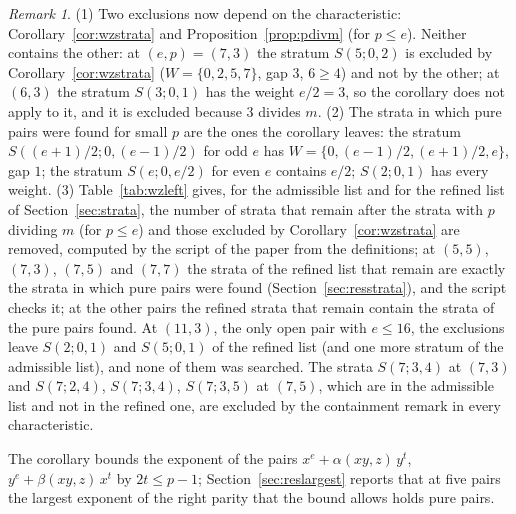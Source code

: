 \documentclass[11pt]{article}
\theoremstyle{definition}
\theoremstyle{remark}
\newtheorem{remark}{Remark}
\begin{document}
\begin{remark}\label{rem:wzstrata}
(1) Two exclusions now depend on the characteristic: Corollary~\ref{cor:wzstrata} and Proposition~\ref{prop:pdivm} (for $p\le e$). Neither contains the other: at $(e,p)=(7,3)$ the stratum $S(5;0,2)$ is excluded by Corollary~\ref{cor:wzstrata} ($W=\{0,2,5,7\}$, gap $3$, $6\ge4$) and not by the other; at $(6,3)$ the stratum $S(3;0,1)$ has the weight $e/2=3$, so the corollary does not apply to it, and it is excluded because $3$ divides $m$. (2) The strata in which pure pairs were found for small $p$ are the ones the corollary leaves: the stratum $S((e+1)/2;0,(e-1)/2)$ for odd $e$ has $W=\{0,(e-1)/2,(e+1)/2,e\}$, gap $1$; the stratum $S(e;0,e/2)$ for even $e$ contains $e/2$; $S(2;0,1)$ has every weight. (3) Table~\ref{tab:wzleft} gives, for the admissible list and for the refined list of Section~\ref{sec:strata}, the number of strata that remain after the strata with $p$ dividing $m$ (for $p\le e$) and those excluded by Corollary~\ref{cor:wzstrata} are removed, computed by the script of the paper from the definitions; at $(5,5)$, $(7,3)$, $(7,5)$ and $(7,7)$ the strata of the refined list that remain are exactly the strata in which pure pairs were found (Section~\ref{sec:resstrata}), and the script checks it; at the other pairs the refined strata that remain contain the strata of the pure pairs found. At $(11,3)$, the only open pair with $e\le16$, the exclusions leave $S(2;0,1)$ and $S(5;0,1)$ of the refined list (and one more stratum of the admissible list), and none of them was searched. The strata $S(7;3,4)$ at $(7,3)$ and $S(7;2,4)$, $S(7;3,4)$, $S(7;3,5)$ at $(7,5)$, which are in the admissible list and not in the refined one, are excluded by the containment remark in every characteristic.
\end{remark}

The corollary bounds the exponent of the pairs $x^e+\alpha(xy,z)\,y^t$, $y^e+\beta(xy,z)\,x^t$ by $2t\le p-1$; Section~\ref{sec:reslargest} reports that at five pairs the largest exponent of the right parity that the bound allows holds pure pairs.

\begin{table}[htbp]
\centering\scriptsize

\caption{The strata that remain after the two exclusions that depend on the characteristic (the strata with $p$ dividing $m$ for $p\le e$, Proposition~\ref{prop:pdivm}; the strata excluded by Corollary~\ref{cor:wzstrata}): for each pair $(e,p)$ the number among the admissible list and among the refined list, the strata of the refined list that remain, and the comparison with the strata in which the search of Section~\ref{sec:resstrata} found pure pairs (``equal'' where the two sets coincide; the number of strata with pure pairs at the other pairs that were run; ``not run'' where the pair was not searched); computed by the script of the paper from the definitions.}
\label{tab:wzleft}
\end{table}
\end{document}

